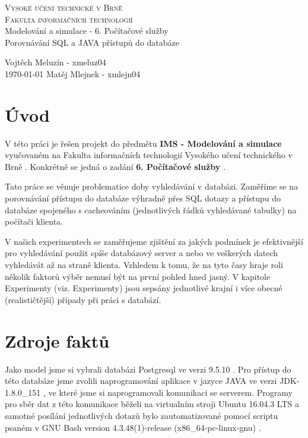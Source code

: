 \documentclass[a4paper, 11pt]{article}
\begin{document}
\thispagestyle{empty}
\begin{center}
\Huge
\textsc{Vysoké učení technické v Brně}\\
\huge
\textsc{Fakulta informačních technologií}\\
\LARGE
{}
Modelování a simulace - 6. Počítačové služby\\ \Huge Porovnávání SQL a JAVA přístupů do databáze
\end{center}

{
\LARGE \hfill
Vojtěch Meluzín - xmeluz04\\
\today \hfill
Matěj Mlejnek - xmlejn04}

\newpage
\thispagestyle{empty}

\tableofcontents

\newpage
\setcounter{page}{1}
\section{Úvod}
V této práci je řešen projekt do předmětu \textbf{IMS - Modelování a simulace} \cite{ims_web} vyučovaném na Fakulta informačních technologií Vysokého učení technického v Brně \cite{fit_web}. Konkrétně se jedná o zadání \textbf{6. Počítačové služby} \cite{zadani_web}.

Tato práce se věnuje problematice doby vyhledávání v databázi. Zaměříme se na porovnávání přístupu do databáze výhradně přes SQL dotazy a přístupu do databáze spojeného s cacheováním (jednotlivých řádků vyhledávané tabulky) na počítači klienta.

V našich experimentech se zaměřujeme zjištění za jakých podmínek je efektivnější pro vyhledávání použit spíše databázový server a nebo ve veškerých datech vyhledávát až na straně klienta. Vzhledem k tomu, že na tyto časy hraje roli několik faktorů výběr nemusí být na první pohled hned jasný. V kapitole Experimenty (viz.   Experimenty) jsou sepsány jednotlivé krajní i více obecné (realističtější) případy při práci s databází. 


\section{Zdroje faktů}
Jako model jsme si vybrali databázi Postgresql ve verzi 9.5.10 \cite{postgresql_web}. Pro přístup do této databáze jsme zvolili naprogramování aplikace v jazyce JAVA \cite{java_web} ve verzi JDK-1.8.0\_151 \cite{java_jdk_version}, ve které jsme si naprogramovali komunikaci se serverem. Programy pro sběr dat z této komunikace běželi na virtualním stroji Ubuntu 16.04.3 LTS \cite{ubuntu_web} a samotné posílání jednotlivých dotazů bylo zautomatizované pomocí scriptu psaném v GNU Bash version 4.3.48(1)-release (x86\_64-pc-linux-gnu) \cite{bash_web}.
\end{document}
